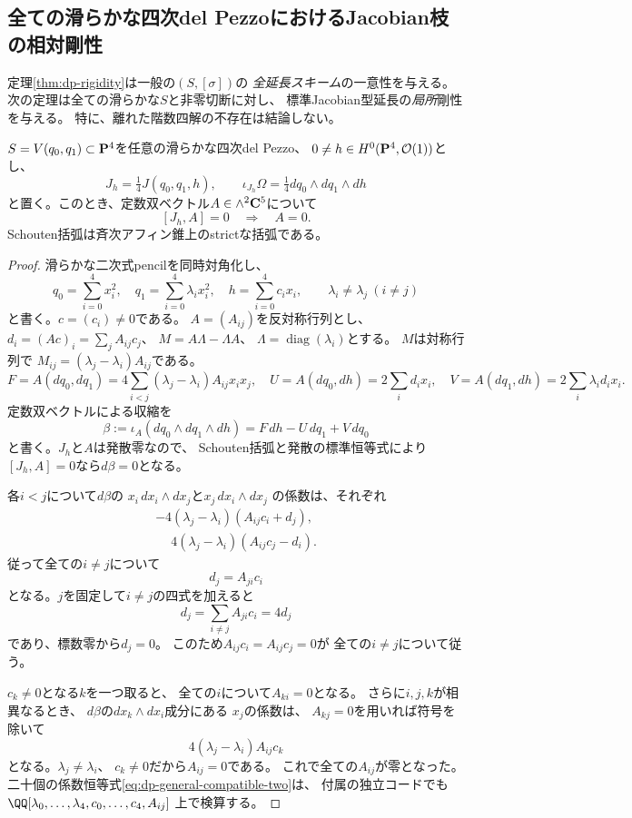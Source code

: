 
\subsection{全ての滑らかな四次del PezzoにおけるJacobian枝の相対剛性}
\label{subsec:dp-universal-jacobian-branch}

定理\ref{thm:dp-rigidity}は一般の$(S,[\sigma])$の
\emph{全延長スキーム}の一意性を与える。
次の定理は全ての滑らかな$S$と非零切断に対し、
標準Jacobian型延長の\emph{局所}剛性を与える。
特に、離れた階数四解の不存在は結論しない。

\begin{lemma}[Jacobian構造と可換な定数双ベクトルの消滅]
\label{lem:dp-no-compatible-constant-bivector}
$S=V(q_0,q_1)\subset\mathbf P^4$を任意の滑らかな四次del Pezzo、
$0\ne h\in H^0(\mathbf P^4,\mathcal O(1))$とし、
\[
 J_h=\tfrac14J(q_0,q_1,h),\qquad
 \iota_{J_h}\Omega=\tfrac14dq_0\wedge dq_1\wedge dh
\]
と置く。このとき、定数双ベクトル$A\in\wedge^2\mathbf C^5$について
\[
 \boxed{\quad [J_h,A]=0\quad\Longrightarrow\quad A=0.\quad}
\]
Schouten括弧は斉次アフィン錐上のstrictな括弧である。
\end{lemma}
\begin{proof}
滑らかな二次式pencilを同時対角化し、
\[
 q_0=\sum_{i=0}^4x_i^2,\quad
 q_1=\sum_{i=0}^4\lambda_ix_i^2,\quad
 h=\sum_{i=0}^4c_ix_i,\qquad
 \lambda_i\ne\lambda_j\ (i\ne j)
\]
と書く。$c=(c_i)\ne0$である。
$A=(A_{ij})$を反対称行列とし、
$d_i=(Ac)_i=\sum_jA_{ij}c_j$、
$M=A\Lambda-\Lambda A$、
$\Lambda=\operatorname{diag}(\lambda_i)$とする。
$M$は対称行列で
$M_{ij}=(\lambda_j-\lambda_i)A_{ij}$である。
\[
 F=A(dq_0,dq_1)=4\sum_{i<j}
     (\lambda_j-\lambda_i)A_{ij}x_ix_j,\quad
 U=A(dq_0,dh)=2\sum_i d_ix_i,\quad
 V=A(dq_1,dh)=2\sum_i\lambda_id_ix_i.
\]
定数双ベクトルによる収縮を
\[
 \beta:=\iota_A(dq_0\wedge dq_1\wedge dh)
       =F\,dh-U\,dq_1+V\,dq_0
\]
と書く。$J_h$と$A$は発散零なので、
Schouten括弧と発散の標準恒等式により
$[J_h,A]=0$なら$d\beta=0$となる。

各$i<j$について$d\beta$の
$x_i\,dx_i\wedge dx_j$と$x_j\,dx_i\wedge dx_j$
の係数は、それぞれ
\begin{equation}\label{eq:dp-general-compatible-two}
 \begin{aligned}
 -4(\lambda_j-\lambda_i)(A_{ij}c_i+d_j),\\
 \phantom{-}4(\lambda_j-\lambda_i)(A_{ij}c_j-d_i).
 \end{aligned}
\end{equation}
従って全ての$i\ne j$について
\[
 d_j=A_{ji}c_i
\]
となる。$j$を固定して$i\ne j$の四式を加えると
\[
 d_j=\sum_{i\ne j}A_{ji}c_i=4d_j
\]
であり、標数零から$d_j=0$。
このため$A_{ij}c_i=A_{ij}c_j=0$が
全ての$i\ne j$について従う。

$c_k\ne0$となる$k$を一つ取ると、
全ての$i$について$A_{ki}=0$となる。
さらに$i,j,k$が相異なるとき、
$d\beta$の$dx_k\wedge dx_i$成分にある
$x_j$の係数は、
$A_{kj}=0$を用いれば符号を除いて
\[
 4(\lambda_j-\lambda_i)A_{ij}c_k
\]
となる。$\lambda_j\ne\lambda_i$、
$c_k\ne0$だから$A_{ij}=0$である。
これで全ての$A_{ij}$が零となった。
二十個の係数恒等式\eqref{eq:dp-general-compatible-two}は、
付属の独立コードでも
$\QQ[\lambda_0,\ldots,\lambda_4,c_0,\ldots,c_4,A_{ij}]$
上で検算する。
\end{proof}

